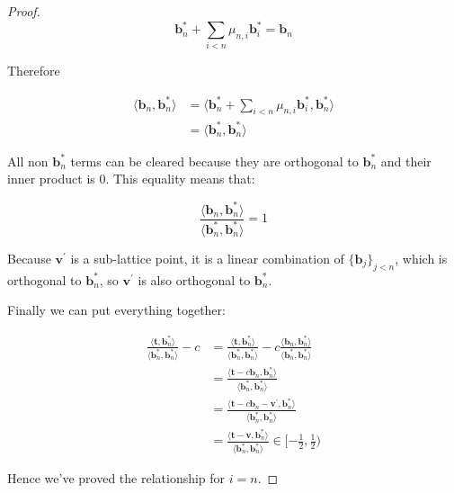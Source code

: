 \begin{proof}
    $$
    \mathbf{b}_n^\ast +\sum_{i<n}\mu_{n, i}\mathbf{b}_i^\ast = \mathbf{b}_n
    $$

    Therefore

    $$
    \begin{aligned}
    \langle\mathbf{b}_n, \mathbf{b}_n^\ast\rangle
    &= \langle 
        \mathbf{b}_n^\ast +\sum_{i<n}\mu_{n, i}\mathbf{b}_i^\ast, \mathbf{b}_n^\ast
    \rangle \\
    &= \langle\mathbf{b}_n^\ast, \mathbf{b}_n^\ast\rangle
    \end{aligned}
    $$

    All non $\mathbf{b}_n^\ast$ terms can be cleared because they are orthogonal to $\mathbf{b}_n^\ast$ and their inner product is 0. This equality means that:

    $$
    \frac{
        \langle\mathbf{b}_n, \mathbf{b}_n^\ast\rangle
    }{
        \langle\mathbf{b}_n^\ast, \mathbf{b}_n^\ast\rangle
    } = 1
    $$

    Because $\mathbf{v}^\prime$ is a sub-lattice point, it is a linear combination of $\{\mathbf{b}_j\}_{j<n}$, which is orthogonal to $\mathbf{b}_n^\ast$, so $\mathbf{v}^\prime$ is also orthogonal to $\mathbf{b}_n^\ast$.

    Finally we can put everything together:

    $$
    \begin{aligned}
    \frac{
        \langle\mathbf{t}, \mathbf{b}_n^\ast\rangle
    }{
        \langle\mathbf{b}_n^\ast, \mathbf{b}_n^\ast\rangle
    }
    - c 
    &= \frac{
        \langle\mathbf{t}, \mathbf{b}_n^\ast\rangle
    }{
        \langle\mathbf{b}_n^\ast, \mathbf{b}_n^\ast\rangle
    }
    - c \frac{
        \langle\mathbf{b}_n, \mathbf{b}_n^\ast\rangle
    }{
        \langle\mathbf{b}_n^\ast, \mathbf{b}_n^\ast\rangle
    } \\
    &= \frac{
        \langle\mathbf{t} - c\mathbf{b}_n, \mathbf{b}_n^\ast\rangle
    }{
        \langle\mathbf{b}_n^\ast, \mathbf{b}_n^\ast\rangle
    } \\
    &= \frac{
        \langle\mathbf{t} - c\mathbf{b}_n - \mathbf{v}^\prime, \mathbf{b}_n^\ast\rangle
    }{
        \langle\mathbf{b}_n^\ast, \mathbf{b}_n^\ast\rangle
    } \\
    &= \frac{
        \langle\mathbf{t} - \mathbf{v}, \mathbf{b}_n^\ast\rangle
    }{
        \langle\mathbf{b}_n^\ast, \mathbf{b}_n^\ast\rangle
    } \in [-\frac{1}{2}, \frac{1}{2})
    \end{aligned}
    $$

    Hence we've proved the relationship for $i = n$.
\end{proof}

